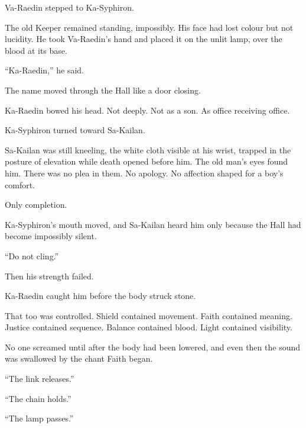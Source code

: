Va-Raedin stepped to Ka-Syphiron.\par

The old Keeper remained standing, impossibly. His face had lost colour but not lucidity. He took Va-Raedin’s hand and placed it on the unlit lamp, over the blood at its base.\par

“Ka-Raedin,” he said.\par

The name moved through the Hall like a door closing.\par

Ka-Raedin bowed his head. Not deeply. Not as a son. As office receiving office.\par

Ka-Syphiron turned toward Sa-Kailan.\par

Sa-Kailan was still kneeling, the white cloth visible at his wrist, trapped in the posture of elevation while death opened before him. The old man’s eyes found him. There was no plea in them. No apology. No affection shaped for a boy’s comfort.\par

Only completion.\par

Ka-Syphiron’s mouth moved, and Sa-Kailan heard him only because the Hall had become impossibly silent.\par

“Do not cling.”\par

Then his strength failed.\par

Ka-Raedin caught him before the body struck stone.\par

That too was controlled. Shield contained movement. Faith contained meaning. Justice contained sequence. Balance contained blood. Light contained visibility.\par

No one screamed until after the body had been lowered, and even then the sound was swallowed by the chant Faith began.\par

“The link releases.”\par

“The chain holds.”\par

“The lamp passes.”\par

